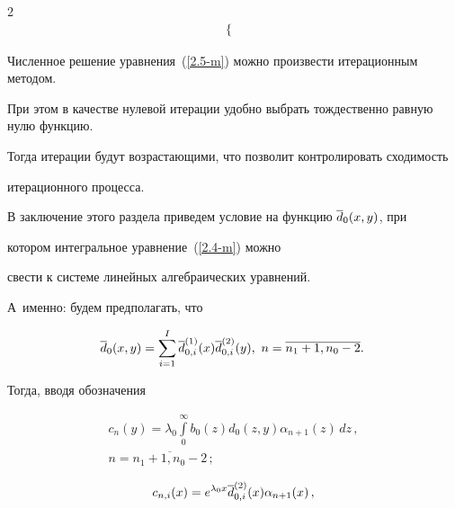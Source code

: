 \begin{multicols}{2}
\begin{multline*}
\begin{cases}
\end{cases}


\end{multline*}


Численное решение уравнения~(\ref{2.5-m}) можно произ\-вес\-ти итерационным методом.


При этом в качестве нулевой итерации удобно выбрать тождественно равную нулю функцию.


Тогда итерации будут возрастающими, что позволит контролировать сходимость 


итерационного процесса.





В заключение этого раздела приведем условие на функцию $\overline d_0(x,y)$, при


котором интегральное уравнение~(\ref{2.4-m}) можно


свести к системе линейных алгебраических уравнений.


А~именно: будем предполагать, что 


\begin{equation}


\label{2.5-1}


\hspace*{-2mm}\d_0(x,y) = \sum\limits_{i=1}^I \d^{(1)}_{0,i}(x) \d^{(2)}_{0,i}(y),


\


 n=\overline{n_1+1,n_0-2}.\!\!


\end{equation}


Тогда, вводя обозначения


\begin{multline*}


c_n(y)= \lambda_0 \int\limits_0^\infty b_0(z) d_0(z,y) \alpha_{n+1}(z)\, dz\,,


\\


 n=\overline{n_1+1,n_0-2}\,;


\end{multline*}





\vspace*{-12pt}





\noindent


\begin{multline*}


c_{n,i}(x) = e^{\lambda_0 x} \d^{(2)}_{0,i}(x) \alpha_{n+1}(x)\,,\\



\end{multline*}
\end{multicols}
